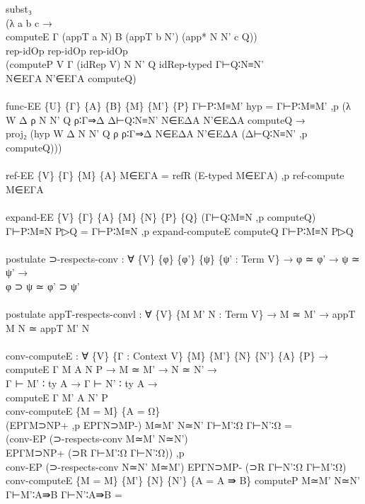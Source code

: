 {\begin{code}
{\>  subst₃\<\\
\>    (λ a b c →\<\\
\>       computeE Γ (appT a N) B (appT b N') (app* N N' c Q))\<\\
\>    rep-idOp rep-idOp rep-idOp \<\\
\>    (computeP V Γ (idRep V) N N' Q idRep-typed Γ⊢Q∶N≡N' \<\\
\>      N∈EΓA N'∈EΓA computeQ)\<\\
\>\<\\
\>func-EE \{U\} \{Γ\} \{A\} \{B\} \{M\} \{M'\} \{P\} Γ⊢P∶M≡M' hyp = Γ⊢P∶M≡M' ,p (λ W Δ ρ N N' Q ρ∶Γ⇒Δ Δ⊢Q∶N≡N' N∈EΔA N'∈EΔA computeQ → \<\\
\>  proj₂ (hyp W Δ N N' Q ρ ρ∶Γ⇒Δ N∈EΔA N'∈EΔA (Δ⊢Q∶N≡N' ,p computeQ)))\<\\
\>\<\\
\>ref-EE \{V\} \{Γ\} \{M\} \{A\} M∈EΓA = refR (E-typed M∈EΓA) ,p ref-compute M∈EΓA\<\\
\>\<\\
\>expand-EE \{V\} \{Γ\} \{A\} \{M\} \{N\} \{P\} \{Q\} (Γ⊢Q∶M≡N ,p computeQ) Γ⊢P∶M≡N P▷Q = Γ⊢P∶M≡N ,p expand-computeE computeQ Γ⊢P∶M≡N P▷Q\<\\
\>\<\\
\>postulate ⊃-respects-conv : ∀ \{V\} \{φ\} \{φ'\} \{ψ\} \{ψ' : Term V\} → φ ≃ φ' → ψ ≃ ψ' →\<\\
\>                          φ ⊃ ψ ≃ φ' ⊃ ψ'\<\\
\>\<\\
\>postulate appT-respects-convl : ∀ \{V\} \{M M' N : Term V\} → M ≃ M' → appT M N ≃ appT M' N\<\\
\>\<\\
\>conv-computeE : ∀ \{V\} \{Γ : Context V\} \{M\} \{M'\} \{N\} \{N'\} \{A\} \{P\} →\<\\
\>             computeE Γ M A N P → M ≃ M' → N ≃ N' → \<\\
\>             Γ ⊢ M' ∶ ty A  → Γ ⊢ N' ∶ ty A  →\<\\
\>             computeE Γ M' A N' P\<\\
\>conv-computeE \{M = M\} \{A = Ω\} \<\\
\>  (EPΓM⊃NP+ ,p EPΓN⊃MP-) M≃M' N≃N' Γ⊢M'∶Ω Γ⊢N'∶Ω = \<\\
\>  (conv-EP (⊃-respects-conv M≃M' N≃N')\<\\
\>    EPΓM⊃NP+ (⊃R Γ⊢M'∶Ω Γ⊢N'∶Ω)) ,p \<\\
\>  conv-EP (⊃-respects-conv N≃N' M≃M') EPΓN⊃MP- (⊃R Γ⊢N'∶Ω Γ⊢M'∶Ω)\<\\
\>conv-computeE \{M = M\} \{M'\} \{N\} \{N'\} \{A = A ⇛ B\} computeP M≃M' N≃N' Γ⊢M'∶A⇛B Γ⊢N'∶A⇛B =\<\\
}
\end{code}}
